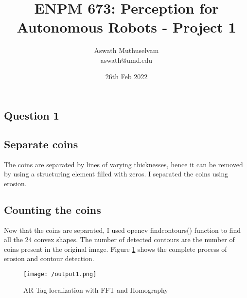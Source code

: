 \documentclass[a4paper, 10pt]{article}
\title{ENPM 673: Perception for Autonomous Robots - Project 1}
\author{Aswath Muthuselvam \\ aswath@umd.edu}
\date{26th Feb 2022}
\begin{document}
	\maketitle
	
	\begin{multicols}{2}
		
		\section{Question 1}
		\subsection{Separate coins}
		
		The coins are separated by lines of varying thicknesses, hence it can be removed by using a structuring element filled with zeros. I separated the coins using erosion.

		\subsection{Counting the coins}
		
		Now that the coins are separated, I used opencv findcontours() function to find all the 24 convex shapes. The number of detected contours are the number of coins present in the original image. Figure \ref{fig:op1} shows the complete process of erosion and contour detection.
				
		\begin{figure}[H]
			\centering
			\texttt{[image: /output1.png]}
			\caption{AR Tag localization with FFT and Homography}
			\label{fig:op1}
		\end{figure}

		
		\begin{comment}
		
		\begin{figure*}
		\centering
		\texttt{[image: /Q1/ARDetectionUsingFFt.png]}
		\caption{Projecting the Testudo image on the ARTag}
		\label{fig:ARTa1g}
		\end{figure*}
		
		\end{comment}
		

\end{multicols}
\end{document}
